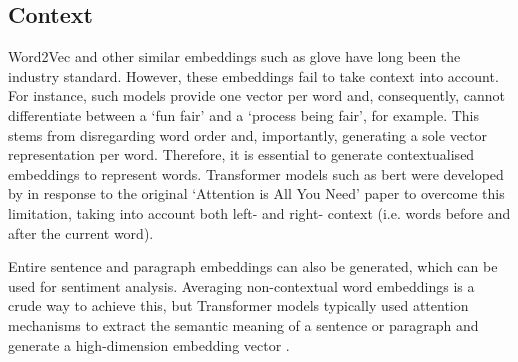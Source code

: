 \subsection{Context}\label{sec:embeddings_context}
Word2Vec and other similar embeddings such as \acrshort{glove} \citep{Pennington} have long been the industry standard. However, these embeddings fail to take context into account. For instance, such models provide one vector per word and, consequently, cannot differentiate between a `fun fair' and a `process being fair', for example. This stems from disregarding word order and, importantly, generating a sole vector representation per word. Therefore, it is essential to generate contextualised embeddings to represent words. Transformer models such as \acrfull{bert} were developed by \citet{devlin2019bert} in response to the original `Attention is All You Need' paper \citep{vaswani2017attention} to overcome this limitation, taking into account both left- and right- context (i.e. words before and after the current word).

Entire sentence and paragraph embeddings can also be generated, which can be used for sentiment analysis. Averaging non-contextual word embeddings is a crude way to achieve this, but Transformer models typically used attention mechanisms to extract the semantic meaning of a sentence or paragraph and generate a high-dimension embedding vector \citep{langchain}.





